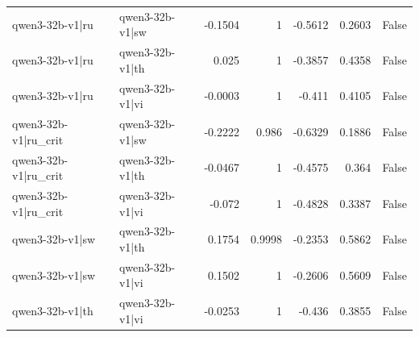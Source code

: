\begin{table}
\begin{tabular}{l l r r r r l}
qwen3-32b-v1|ru & qwen3-32b-v1|sw & -0.1504 & 1 & -0.5612 & 0.2603 & False \\
qwen3-32b-v1|ru & qwen3-32b-v1|th & 0.025 & 1 & -0.3857 & 0.4358 & False \\
qwen3-32b-v1|ru & qwen3-32b-v1|vi & -0.0003 & 1 & -0.411 & 0.4105 & False \\
qwen3-32b-v1|ru_crit & qwen3-32b-v1|sw & -0.2222 & 0.986 & -0.6329 & 0.1886 & False \\
qwen3-32b-v1|ru_crit & qwen3-32b-v1|th & -0.0467 & 1 & -0.4575 & 0.364 & False \\
qwen3-32b-v1|ru_crit & qwen3-32b-v1|vi & -0.072 & 1 & -0.4828 & 0.3387 & False \\
qwen3-32b-v1|sw & qwen3-32b-v1|th & 0.1754 & 0.9998 & -0.2353 & 0.5862 & False \\
qwen3-32b-v1|sw & qwen3-32b-v1|vi & 0.1502 & 1 & -0.2606 & 0.5609 & False \\
qwen3-32b-v1|th & qwen3-32b-v1|vi & -0.0253 & 1 & -0.436 & 0.3855 & False \\
\bottomrule
\end{tabular}
\end{table}
